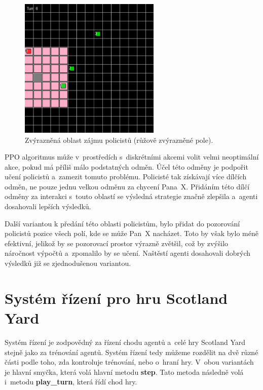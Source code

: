 \begin{figure}[H]
	\centering
	\includegraphics[width=0.6\textwidth]{obrazky-figures/interest_area}
      \caption{Zvýrazněná oblast zájmu policistů (růžově zvýrazněné pole).}
    \label{fig:game_11}
\end{figure}

PPO algoritmus může v~prostředích s~diskrétními akcemi volit velmi neoptimální akce, pokud má příliš málo podstatných odměn\cite{PPO_weakness}.
Účel této odměny je podpořit učení policistů a~zamezit tomuto problému.
Policisté tak získávají více dílčích odměn, ne pouze jednu velkou odměnu za chycení Pana~X\@.
Přidáním této dílčí odměny za interakci s~touto oblastí se výsledná strategie značně zlepšila a~agenti dosahovali lepších výsledků.

Další variantou k předání této oblasti policistům, bylo přidat do pozorování policistů pozice všech polí, kde se může Pan~X nacházet.
Toto by však bylo méně efektivní, jelikož by se pozorovací prostor výrazně zvětšil, což by zvýšilo náročnost výpočtů a~zpomalilo by se učení.
Naštěstí agenti dosahovali dobrých výsledků již se zjednodušenou variantou.

\section{Systém řízení pro hru Scotland Yard}
\label{sec:system_rizeni}
Systém řízení je zodpovědný za řízení chodu agentů a~celé hry Scotland Yard stejně jako za trénování agentů.
Systém řízení tedy můžeme rozdělit na dvě různé části podle toho, zda kontroluje trénování, nebo o~hraní hry.
V~obou variantách je hlavní smyčka, která volá hlavní metodu \textbf{step}.
Tato metoda následně volá i~metodu \textbf{play\_turn}, která řídí chod hry.

